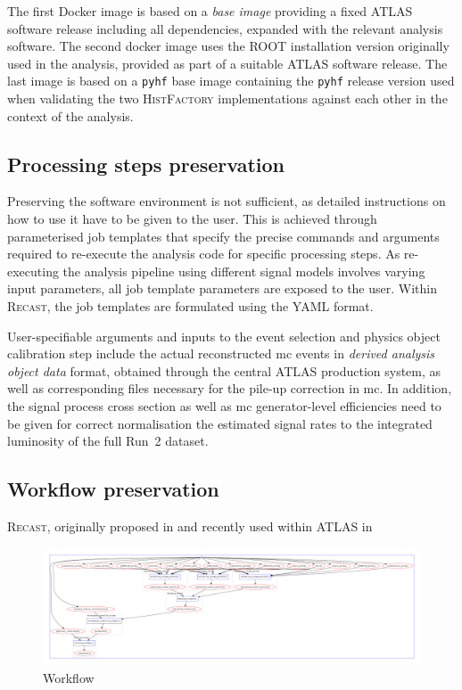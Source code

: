 The first Docker image is based on a \textit{base image} providing a fixed ATLAS software release including all dependencies, expanded with the relevant analysis software. The second docker image uses the \textsc{ROOT} installation version originally used in the analysis, provided as part of a suitable ATLAS software release. The last image is based on a \texttt{pyhf} base image containing the \texttt{pyhf} release version used when validating the two \textsc{HistFactory} implementations against each other in the context of the analysis. 

\subsection{Processing steps preservation}

Preserving the software environment is not sufficient, as detailed instructions on how to use it have to be given to the user. This is achieved through parameterised job templates that specify the precise commands and arguments required to re-execute the analysis code for specific processing steps. As re-executing the analysis pipeline using different signal models involves varying input parameters, all job template parameters are exposed to the user. Within \textsc{Recast}, the job templates are formulated using the YAML format. 

User-specifiable arguments and inputs to the event selection and physics object calibration step include the actual reconstructed \gls{mc} events in \textit{derived analysis object data} format, obtained through the central ATLAS production system, as well as corresponding files necessary for the pile-up correction in \gls{mc}. In addition, the signal process cross section as well as \gls{mc} generator-level efficiencies need to be given for correct normalisation the estimated signal rates to the integrated luminosity of the full Run~2 dataset.

\subsection{Workflow preservation}



\textsc{Recast}, originally proposed in \cite{RECAST_cranmer} and recently used within ATLAS in \eg {}\cite{ATL-PHYS-PUB-2019-032}




 \begin{figure}
	\centering\includegraphics[width=\textwidth]{yadage_workflow_instance}
	\caption{Workflow}
	\label{fig:recast_workflow}
\end{figure}

